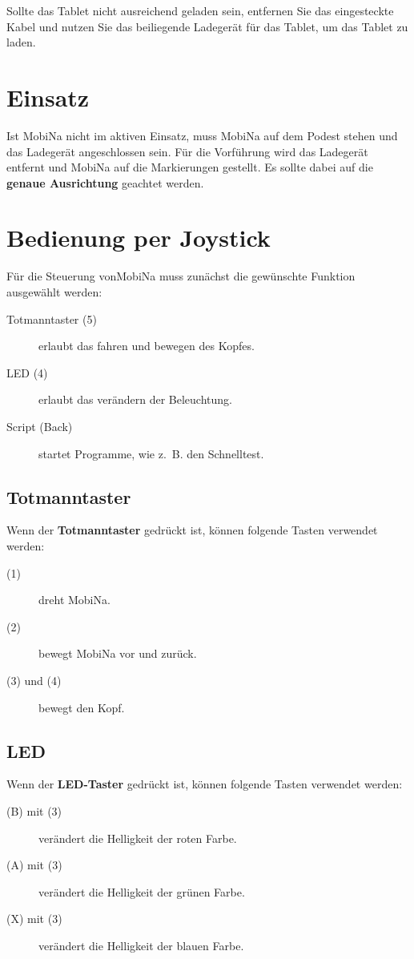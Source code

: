 \documentclass[11pt]{article} %
\newcommand{\mb}{MobiNa}
\begin{document}
\begin{shaded}
Sollte das Tablet nicht ausreichend geladen sein, entfernen Sie das eingesteckte Kabel und nutzen Sie das beiliegende Ladegerät für das Tablet, um das Tablet zu laden.
\end{shaded}
\section{Einsatz}

Ist \mb{} nicht im aktiven Einsatz, muss \mb{} auf dem Podest stehen und das Ladegerät angeschlossen sein.
Für die Vorführung wird das Ladegerät entfernt und \mb{} auf die Markierungen gestellt.
Es sollte dabei auf die \textbf{genaue Ausrichtung} geachtet werden.

\section{Bedienung per Joystick}

Für die Steuerung von\mb{} muss zunächst die gewünschte Funktion ausgewählt werden:
\begin{description}
	\item[Totmanntaster (5)] erlaubt das fahren und bewegen des Kopfes.
	\item[LED (4)] erlaubt das verändern der Beleuchtung.
	\item[Script (Back)] startet Programme, wie z.~B. den Schnelltest.
\end{description}

\subsection{Totmanntaster}
Wenn der \textbf{Totmanntaster} gedrückt ist, können folgende Tasten verwendet werden:
\begin{description}
	\item[(1)] dreht \mb{}.
	\item[(2)] bewegt \mb{} vor und zurück.
	\item[(3) und (4)] bewegt den Kopf.
\end{description}

\subsection{LED}
Wenn der \textbf{LED-Taster} gedrückt ist, können folgende Tasten verwendet werden:
\begin{description}
	\item[(B) mit (3)] verändert die Helligkeit der roten Farbe.
	\item[(A) mit (3)] verändert die Helligkeit der grünen Farbe.
	\item[(X) mit (3)] verändert die Helligkeit der blauen Farbe.
\end{description}
\end{document}
